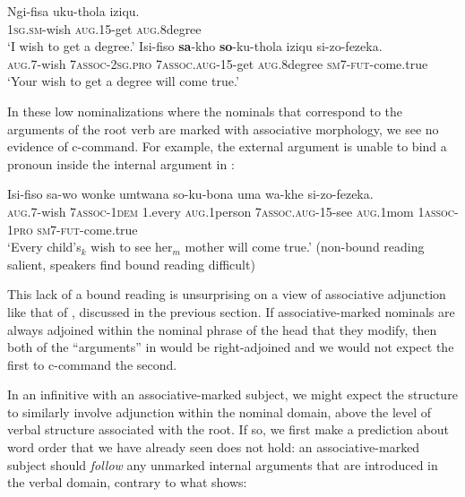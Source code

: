 \documentclass[output=paper,colorlinks,citecolor=brown]{langscibook}
\begin{document}
\ea%
    \label{ex:halpert:14}
    \ea%
    \label{ex:halpert:14a}
    \gll    Ngi-fisa uku-thola iziqu.\\
            1\textsc{sg}.\textsc{sm}-wish \textsc{aug}.15-get \textsc{aug}.8degree\\
    \glt    `I wish to get a degree.' 
    \ex%
    \label{ex:halpert:14b}
    \gll    Isi-fiso \textbf{sa}-kho \textbf{so}-ku-thola iziqu si-zo-fezeka.\\
            \textsc{aug}.7-wish 7\textsc{assoc}-2\textsc{sg}.\textsc{pro} 7\textsc{assoc}.\textsc{aug}-15-get \textsc{aug}.8degree \textsc{sm}7-\textsc{fut}-come.true\\
    \glt    `Your wish to get a degree will come true.'
    \z 
\z 

In these low nominalizations where the nominals that correspond to the arguments of the root verb are marked with associative morphology, we see no evidence of c-command. For example, the external argument is unable to bind a pronoun inside the internal argument in :

\ea%
    \label{ex:halpert:15}
    \gll    Isi-fiso sa-wo wonke umtwana so-ku-bona uma wa-khe si-zo-fezeka.\\
            \textsc{aug}.7-wish 7\textsc{assoc}-1\textsc{dem} 1.every \textsc{aug}.1person 7\textsc{assoc}.\textsc{aug}-15-see \textsc{aug}.1mom 1\textsc{assoc}-1\textsc{pro} \textsc{sm}7-\textsc{fut}-come.true\\
    \glt    `Every child's$_k$ wish to see her$_m$ mother will come true.' (non-bound reading salient, speakers find bound reading difficult)
\z 

This lack of a bound reading is unsurprising on a view of associative adjunction like that of \citet{Pietraszko2019}, discussed in the previous section. If associative-marked nominals are always adjoined within the nominal phrase of the head that they modify, then both of the ``arguments'' in  would be right-adjoined and we would not expect the first to c-command the second.  

In an infinitive with an associative-marked subject, we might expect the structure to similarly involve adjunction within the nominal domain, above the level of verbal structure associated with the root.  If so, we first make a prediction about word order that we have already seen does not hold: an associative-marked subject should \textit{follow} any unmarked internal arguments that are introduced in the verbal domain, contrary to what  shows:
\end{document}
